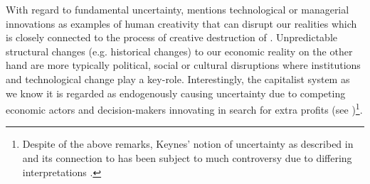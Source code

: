 \documentclass[a4paper,11pt,listof=nochaptergap,oneside,pointednumbers,bibtotoc,bigheadings,liststotoc]{scrbook}
\theoremstyle{mysatz}
\theoremstyle{mydefinition}
\theoremstyle{mytheorem}
\theoremstyle{mybemerkung}
\begin{document}
With regard to fundamental uncertainty, \citet{dequesh:00} mentions technological or managerial innovations as examples of human creativity that can disrupt our realities which is closely connected to the process of creative destruction of \citet{schumpeter:42}. Unpredictable structural changes (e.g. historical changes) to our economic reality on the other hand are more typically political, social or cultural disruptions where institutions and technological change play a key-role. Interestingly, the capitalist system as we know it is regarded as endogenously causing uncertainty due to competing economic actors and decision-makers innovating in search for extra profits (see \citealp{kregel:87})\footnote{Despite of the above remarks, Keynes' notion of uncertainty as described in \citet{keynes:21} and its connection to \citet{keynes:37} has been subject to much controversy due to differing interpretations \citep{dequesh:00}.}.
\end{document}
